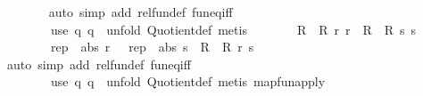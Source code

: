 \begin{isabellebody}
\ \ \ \ \ \ \isamarkupfalse%
\ {\isacharparenleft}{\kern0pt}auto\ simp\ add{\isacharcolon}{\kern0pt}\ rel{\isacharunderscore}{\kern0pt}fun{\isacharunderscore}{\kern0pt}def\ fun{\isacharunderscore}{\kern0pt}eq{\isacharunderscore}{\kern0pt}iff{\isacharparenright}{\kern0pt}\isanewline
\ \ \ \ \ \ \ \ {\isacharparenleft}{\kern0pt}use\ q{}\ q{}\ \ {\isacartoucheopen}unfold\ Quotient{}{\isacharunderscore}{\kern0pt}def{\isacharcomma}{\kern0pt}\ metis{\isacartoucheclose}{\isacharparenright}{\kern0pt}\isanewline
\ \ \ \ \isamarkupfalse%
\ \isamarkupfalse%
\ {\isachardoublequoteopen}{\isacharparenleft}{\kern0pt}{\isacharparenleft}{\kern0pt}R{}\ {\isacharequal}{\kern0pt}{\isacharequal}{\kern0pt}{\isacharequal}{\kern0pt}{\isachargreater}{\kern0pt}\ R{}{\isacharparenright}{\kern0pt}\ r\ r\ {\isasymand}\ {\isacharparenleft}{\kern0pt}R{}\ {\isacharequal}{\kern0pt}{\isacharequal}{\kern0pt}{\isacharequal}{\kern0pt}{\isachargreater}{\kern0pt}\ R{}{\isacharparenright}{\kern0pt}\ s\ s\ {\isasymand}\isanewline
\ \ \ \ \ \ \ \ {\isacharparenleft}{\kern0pt}rep{}\ {\isacharminus}{\kern0pt}{\isacharminus}{\kern0pt}{\isacharminus}{\kern0pt}{\isachargreater}{\kern0pt}\ abs{}{\isacharparenright}{\kern0pt}\ r\ \ {\isacharequal}{\kern0pt}\ {\isacharparenleft}{\kern0pt}rep{}\ {\isacharminus}{\kern0pt}{\isacharminus}{\kern0pt}{\isacharminus}{\kern0pt}{\isachargreater}{\kern0pt}\ abs{}{\isacharparenright}{\kern0pt}\ s{\isacharparenright}{\kern0pt}\ {\isasymLongrightarrow}\ {\isacharparenleft}{\kern0pt}R{}\ {\isacharequal}{\kern0pt}{\isacharequal}{\kern0pt}{\isacharequal}{\kern0pt}{\isachargreater}{\kern0pt}\ R{}{\isacharparenright}{\kern0pt}\ r\ s{\isachardoublequoteclose}\isanewline
\ \ \ \ \ \ \isamarkupfalse%
\ {\isacharparenleft}{\kern0pt}auto\ simp\ add{\isacharcolon}{\kern0pt}\ rel{\isacharunderscore}{\kern0pt}fun{\isacharunderscore}{\kern0pt}def\ fun{\isacharunderscore}{\kern0pt}eq{\isacharunderscore}{\kern0pt}iff{\isacharparenright}{\kern0pt}\isanewline
\ \ \ \ \ \ \ \ {\isacharparenleft}{\kern0pt}use\ q{}\ q{}\ \ {\isacartoucheopen}unfold\ Quotient{}{\isacharunderscore}{\kern0pt}def{\isacharcomma}{\kern0pt}\ metis\ map{\isacharunderscore}{\kern0pt}fun{\isacharunderscore}{\kern0pt}apply{\isacartoucheclose}{\isacharparenright}{\kern0pt}\isanewline
\ \ \ \ \isamarkupfalse%

\end{isabellebody}
